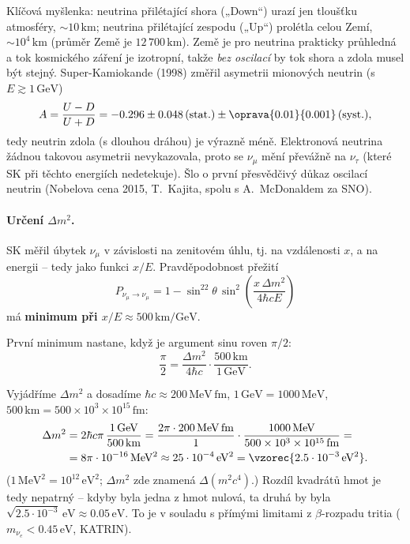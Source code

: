 Klíčová myšlenka: neutrina přilétající shora („Down“) urazí jen tloušťku atmosféry, \(\sim10\,\mathrm{km}\); neutrina přilétající zespodu („Up“) prolétla celou Zemí, \(\sim10^4\,\mathrm{km}\) (průměr Země je \(12\,700\,\mathrm{km}\)). Země je pro neutrina prakticky průhledná a tok kosmického záření je izotropní, takže \emph{bez oscilací} by tok shora a zdola musel být stejný. Super-Kamiokande (1998) změřil asymetrii mionových neutrin (s \(E\gtrsim1\,\mathrm{GeV}\))
\begin{equation}
  A=\frac{U-D}{U+D}=-0.296\pm0.048\,(\text{stat.})\pm\oprava{0.01}{0.001}\,(\text{syst.}),
\end{equation}
tedy neutrin zdola (s dlouhou dráhou) je výrazně méně. Elektronová neutrina žádnou takovou asymetrii nevykazovala, proto se \(\nu_\mu\) mění převážně na \(\nu_\tau\) (které SK při těchto energiích nedetekuje). Šlo o první přesvědčivý důkaz oscilací neutrin (Nobelova cena 2015, T.~Kajita, spolu s A.~McDonaldem za SNO).

\paragraph{Určení \(\Delta m^2\).} SK měřil úbytek \(\nu_\mu\) v závislosti na zenitovém úhlu, tj. na vzdálenosti \(x\), a na energii -- tedy jako funkci \(x/E\). Pravděpodobnost přežití
\[
  P_{\nu_\mu\to\nu_\mu}=1-\sin^22\theta\,\sin^2\!\left(\frac{x\,\Delta m^2}{4\hbar cE}\right)
\]
má \textbf{minimum při \(x/E\approx500\,\mathrm{km/GeV}\)}.

První minimum nastane, když je argument sinu roven \(\pi/2\):
\[
  \frac{\pi}{2}=\frac{\Delta m^2}{4\hbar c}\cdot\frac{500\,\mathrm{km}}{1\,\mathrm{GeV}} .
\]
\begin{priklad}
Vyjádříme \(\Delta m^2\) a dosadíme \(\hbar c\approx200\,\mathrm{MeV\,fm}\), \(1\,\mathrm{GeV}=1000\,\mathrm{MeV}\), \(500\,\mathrm{km}=500\times10^3\times10^{15}\,\mathrm{fm}\):
\begin{align*}
  \Delta m^2&=2\hbar c\pi\,\frac{1\,\mathrm{GeV}}{500\,\mathrm{km}}
  =\frac{2\pi\cdot200\,\mathrm{MeV\,fm}}{1}\cdot\frac{1000\,\mathrm{MeV}}{500\times10^3\times10^{15}\,\mathrm{fm}}=\\
  &=8\pi\cdot10^{-16}\,\mathrm{MeV^2}\approx25\cdot10^{-4}\,\mathrm{eV^2}=\vzorec{2.5\cdot10^{-3}\,\mathrm{eV^2}}.
\end{align*}
(\(1\,\mathrm{MeV^2}=10^{12}\,\mathrm{eV^2}\); \(\Delta m^2\) zde znamená \(\Delta(m^2c^4)\).) Rozdíl kvadrátů hmot je tedy nepatrný -- kdyby byla jedna z hmot nulová, ta druhá by byla \(\sqrt{2.5\cdot10^{-3}}\,\mathrm{eV}\approx0.05\,\mathrm{eV}\). To je v souladu s přímými limitami z \(\beta\)-rozpadu tritia (\(m_{\nu_e}<0.45\,\mathrm{eV}\), KATRIN).
\end{priklad}

